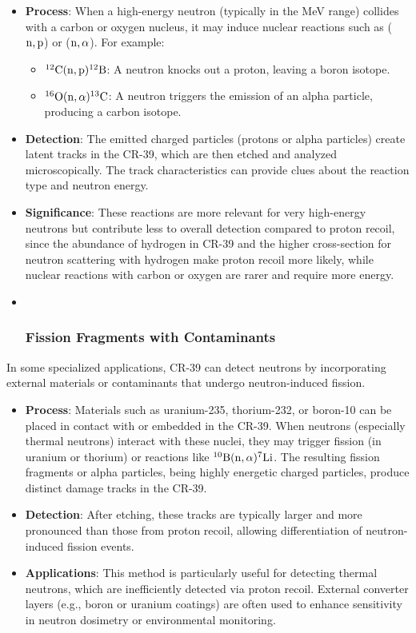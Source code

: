 \documentclass[
]{article}
\renewcommand{\[}{\begin{equation}}
\renewcommand{\]}{\end{equation}}
\providecommand{\tightlist}{%
  \setlength{\itemsep}{0pt}\setlength{\parskip}{0pt}}
\begin{document}
\begin{itemize}
\item
  \textbf{Process}: When a high-energy neutron (typically in the MeV
  range) collides with a carbon or oxygen nucleus, it may induce nuclear
  reactions such as (\(\rm n, p\)) or (\(\rm n, \alpha\)). For example:

  \begin{itemize}
  \tightlist
  \item
    \(\rm ^{12}C(n, p)^{12}B\): A neutron knocks out a proton, leaving a
    boron isotope.
  \item
    \(\rm ^{16}O(n, \alpha)^{13}C\): A neutron triggers the emission of
    an alpha particle, producing a carbon isotope.
  \end{itemize}
\item
  \textbf{Detection}: The emitted charged particles (protons or alpha
  particles) create latent tracks in the CR-39, which are then etched
  and analyzed microscopically. The track characteristics can provide
  clues about the reaction type and neutron energy.
\item
  \textbf{Significance}: These reactions are more relevant for very
  high-energy neutrons but contribute less to overall detection compared
  to proton recoil, since the abundance of hydrogen in CR-39 and the
  higher cross-section for neutron scattering with hydrogen make proton
  recoil more likely, while nuclear reactions with carbon or oxygen are
  rarer and require more energy.
\item ~
  \subsubsection{Fission Fragments with
  Contaminants}\label{fission-fragments-with-contaminants}
\end{itemize}

In some specialized applications, CR-39 can detect neutrons by
incorporating external materials or contaminants that undergo
neutron-induced fission.

\begin{itemize}
\tightlist
\item
  \textbf{Process}: Materials such as uranium-235, thorium-232, or
  boron-10 can be placed in contact with or embedded in the CR-39. When
  neutrons (especially thermal neutrons) interact with these nuclei,
  they may trigger fission (in uranium or thorium) or reactions like
  \(\rm ^{10}B(n, \alpha)^{7}Li\). The resulting fission fragments or
  alpha particles, being highly energetic charged particles, produce
  distinct damage tracks in the CR-39.
\item
  \textbf{Detection}: After etching, these tracks are typically larger
  and more pronounced than those from proton recoil, allowing
  differentiation of neutron-induced fission events.
\item
  \textbf{Applications}: This method is particularly useful for
  detecting thermal neutrons, which are inefficiently detected via
  proton recoil. External converter layers (e.g., boron or uranium
  coatings) are often used to enhance sensitivity in neutron dosimetry
  or environmental monitoring.
\end{itemize}
\end{document}
